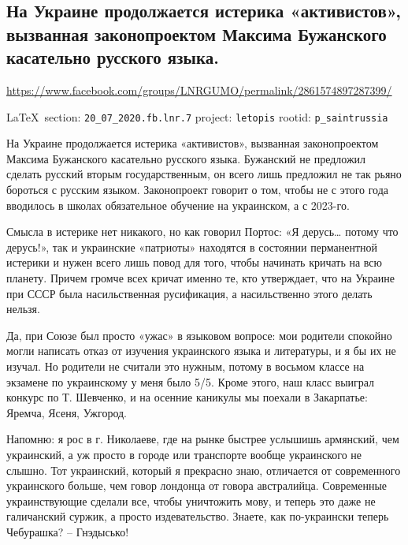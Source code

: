  
 

\subsection{
На Украине продолжается истерика «активистов», вызванная законопроектом Максима Бужанского касательно русского языка.}
\url{https://www.facebook.com/groups/LNRGUMO/permalink/2861574897287399/}
  
\vspace{0.5cm}
{\small\LaTeX~section: \verb|20_07_2020.fb.lnr.7| project: \verb|letopis| rootid: \verb|p_saintrussia|}
\vspace{0.5cm}

На Украине продолжается истерика «активистов», вызванная законопроектом Максима
Бужанского касательно русского языка. Бужанский не предложил сделать русский
вторым государственным, он всего лишь предложил не так рьяно бороться с русским
языком. Законопроект говорит о том, чтобы не с этого года вводилось в школах
обязательное обучение на украинском, а с 2023-го.

Смысла в истерике нет никакого, но как говорил Портос: «Я дерусь… потому что
дерусь!», так и украинские «патриоты» находятся в состоянии перманентной
истерики и нужен всего лишь повод для того, чтобы начинать кричать на всю
планету. Причем громче всех кричат именно те, кто утверждает, что на Украине
при СССР была насильственная русификация, а насильственно этого делать нельзя.

Да, при Союзе был просто «ужас» в языковом вопросе: мои родители спокойно могли
написать отказ от изучения украинского языка и литературы, и я бы их не изучал.
Но родители не считали это нужным, потому в восьмом классе на экзамене по
украинскому у меня было 5/5. Кроме этого, наш класс выиграл конкурс по Т.
Шевченко, и на осенние каникулы мы поехали в Закарпатье: Яремча, Ясеня,
Ужгород.

Напомню: я рос в г. Николаеве, где на рынке быстрее услышишь армянский, чем
украинский, а уж просто в городе или транспорте вообще украинского не слышно.
Тот украинский, который я прекрасно знаю, отличается от современного
украинского больше, чем говор лондонца от говора австралийца. Современные
украинствующие сделали все, чтобы уничтожить мову, и теперь это даже не
галичанский суржик, а просто издевательство. Знаете, как по-украински теперь
Чебурашка? – Гнэдысько!

